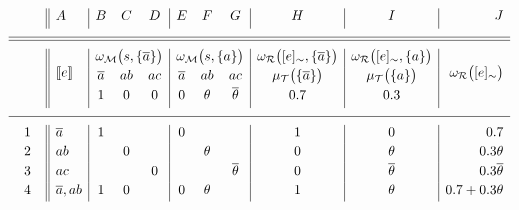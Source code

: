 \documentclass[x11names]{tlp}
\begin{document}
\ifExamples
	\begin{example}\label{ex:weights.sm}\em
		\begin{equation*}
			\begin{array}{c||l|ccc|ccc|c|c|r}
				  &
				A & B                                         & C      & D           & E & F & G & H & I & J
				\\[3pt]
				\hline
				\hline
				\multirow{3}{*}{\phantom{2em}}
				  & \multirow{3}{*}{\stablecore{e}}
				  & \multicolumn{3}{c|}{\wgtm{s,\set{\co{a}}}}
				  & \multicolumn{3}{c|}{\wgtm{s,\set{a}}}
				  & \wgtc{\class{e},\set{\co{a}}}
				  & \wgtc{\class{e},\set{a}}
				  & \multirow{3}{*}{\wgtc{\class{e}}}
				\\[2pt]
				  &
				  & \co{a}                                    & ab     & ac
				  & \co{a}                                    & ab     & ac
				  & \pwt{\set{\co{a}}}
				  & \pwt{\set{a}}
				  &
				\\[2pt]
				  &
				  & 1                                         & 0      & 0
				  & 0                                         & \theta & \co{\theta}
				  & 0.7
				  & 0.3
				  &
				\\[3pt]
				\hline
				1
				  & \co{a}
				  & 1                                         &        &
				  & 0                                         &        &
				  & 1
				  & 0
				  & 0.7
				\\[2pt]
				2
				  & ab
				  &                                           & 0      &
				  &                                           & \theta &
				  & 0
				  & \theta
				  & 0.3\theta
				\\[2pt]
				3
				  & ac
				  &                                           &        & 0
				  &                                           &        & \co{\theta}
				  & 0
				  & \co{\theta}
				  & 0.3\co{\theta}
				\\[2pt]
				4
				  & \co{a}, ab
				  & 1                                         & 0      &
				  & 0                                         & \theta &
				  & 1
				  & \theta
				  & 0.7 + 0.3\theta
				\\[2pt]

\end{array}
\end{equation*}
\end{example}
\end{document}
